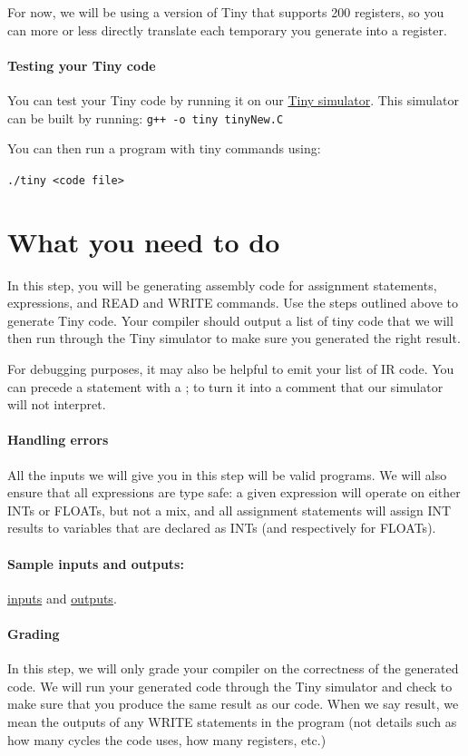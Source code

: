 \documentclass{article}
\begin{document}
For now, we will be using a version of Tiny that supports 200 registers, so you can more or less directly translate each temporary you generate into a register.

\paragraph{Testing your Tiny code}
You can test your Tiny code by running it on our \href{https://hegden.github.io/cs406/homeworks/PA4/tinyNew.C}{Tiny simulator}. This simulator can be built by running:
\texttt{g++ -o tiny tinyNew.C}

You can then run a program with tiny commands using:

\texttt{./tiny <code file>}

\section{What you need to do}
In this step, you will be generating assembly code for assignment statements, expressions, and READ and WRITE commands. Use the steps outlined above to generate Tiny code. Your compiler should output a list of tiny code that we will then run through the Tiny simulator to make sure you generated the right result.

For debugging purposes, it may also be helpful to emit your list of IR code. You can precede a statement with a ; to turn it into a comment that our simulator will not interpret.

\paragraph{Handling errors}
All the inputs we will give you in this step will be valid programs. We will also ensure that all expressions are type safe: a given expression will operate on either INTs or FLOATs, but not a mix, and all assignment statements will assign INT results to variables that are declared as INTs (and respectively for FLOATs).

\paragraph{Sample inputs and outputs:} \href{https://hegden.github.io/cs406/homeworks/PA4/inputs.zip}{inputs} and \href{https://hegden.github.io/cs406/homeworks/PA4/outputs.zip}{outputs}.

\paragraph{Grading}
In this step, we will only grade your compiler on the correctness of the generated code. We will run your generated code through the Tiny simulator and check to make sure that you produce the same result as our code. When we say result, we mean the outputs of any WRITE statements in the program (not details such as how many cycles the code uses, how many registers, etc.)
\end{document}

